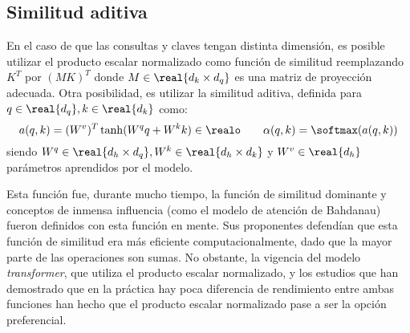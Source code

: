 \subsection{Similitud aditiva}
En el caso de que las consultas y claves tengan distinta dimensión, es posible utilizar el producto escalar normalizado como función de similitud reemplazando \( K^T \) por \(  (MK)^T \) donde \( M \in \real{d_k \times d_q }\) es una matriz de proyección adecuada. Otra posibilidad, es utilizar la similitud aditiva, definida para \( q \in \real{d_q}, k \in \real{d_k} \) como:
\[
    a(q, k) = (W^v)^T \tanh(W^q q + W^k k) \in \realo \qquad \alpha(q ,k) = \softmax(a(q,k))
\]
siendo \( W^q \in \real{d_h \times d_q}, W^k \in \real{d_h \times d_k} \) y \( W^v \in \real{d_h} \)
parámetros aprendidos por el modelo.

Esta función fue, durante mucho tiempo, la función de similitud dominante y conceptos de inmensa influencia (como el modelo de atención de Bahdanau) fueron definidos con esta función en mente. Sus proponentes defendían que esta función de similitud era más eficiente computacionalmente, dado que la mayor parte de las operaciones son sumas. No obstante, la vigencia del modelo \textit{transformer}, que utiliza el producto escalar normalizado, y los estudios que han demostrado que en la práctica hay poca diferencia de rendimiento entre ambas funciones han hecho que el producto escalar normalizado pase a ser la opción preferencial.


